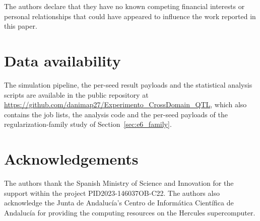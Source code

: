 \documentclass[preprint,number,sort&compress]{elsarticle}
\begin{document}
The authors declare that they have no known competing financial interests
or personal relationships that could have appeared to influence the work
reported in this paper.

\section*{Data availability}

The simulation pipeline, the per-seed result payloads and the statistical
analysis scripts are available in the public repository at
\url{https://github.com/danimap27/Experimento_CrossDomain_QTL}, which also
contains the job lists, the analysis code and the per-seed payloads of the
regularization-family study of Section~\ref{sec:e6_family}.

\section*{Acknowledgements}

The authors thank the Spanish Ministry of Science and Innovation for the
support within the project PID2023-146037OB-C22. The authors also
acknowledge the Junta de Andaluc\'ia's Centro de Inform\'atica
Cient\'ifica de Andaluc\'ia for providing the computing resources on the
Hercules supercomputer.



\end{document}
